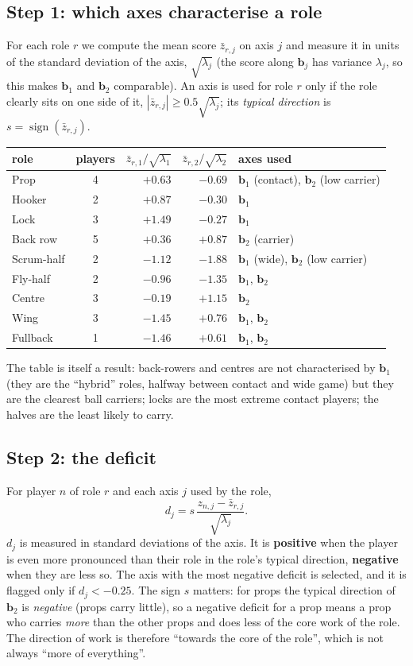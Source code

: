 \documentclass[11pt,a4paper]{article}
\theoremstyle{remark}
\newcommand{\bb}{\mathbf{b}}
\begin{document}
\subsection{Step 1: which axes characterise a role}
For each role $r$ we compute the mean score $\bar z_{r,j}$ on axis $j$ and measure it in units of the
standard deviation of the axis, $\sqrt{\lambda_j}$ (the score along $\bb_j$ has variance $\lambda_j$, so this
makes $\bb_1$ and $\bb_2$ comparable). An axis is used for role $r$ only if the role clearly sits on one
side of it, $|\bar z_{r,j}|\ge 0.5\sqrt{\lambda_j}$; its \emph{typical direction} is
$s=\operatorname{sign}(\bar z_{r,j})$.
\begin{center}
\begin{tabular}{lcrrl}
\toprule
role & players & $\bar z_{r,1}/\sqrt{\lambda_1}$ & $\bar z_{r,2}/\sqrt{\lambda_2}$ & axes used\\
\midrule
Prop & 4 & $+0.63$ & $-0.69$ & $\bb_1$ (contact), $\bb_2$ (low carrier)\\
Hooker & 2 & $+0.87$ & $-0.30$ & $\bb_1$\\
Lock & 3 & $+1.49$ & $-0.27$ & $\bb_1$\\
Back row & 5 & $+0.36$ & $+0.87$ & $\bb_2$ (carrier)\\
Scrum-half & 2 & $-1.12$ & $-1.88$ & $\bb_1$ (wide), $\bb_2$ (low carrier)\\
Fly-half & 2 & $-0.96$ & $-1.35$ & $\bb_1$, $\bb_2$\\
Centre & 3 & $-0.19$ & $+1.15$ & $\bb_2$\\
Wing & 3 & $-1.45$ & $+0.76$ & $\bb_1$, $\bb_2$\\
Fullback & 1 & $-1.46$ & $+0.61$ & $\bb_1$, $\bb_2$\\
\bottomrule
\end{tabular}
\end{center}
The table is itself a result: back-rowers and centres are not characterised by $\bb_1$ (they are the
``hybrid'' roles, halfway between contact and wide game) but they are the clearest ball carriers;
locks are the most extreme contact players; the halves are the least likely to carry.

\subsection{Step 2: the deficit}
For player $n$ of role $r$ and each axis $j$ used by the role,
\[
d_j=s\,\frac{z_{n,j}-\bar z_{r,j}}{\sqrt{\lambda_j}} .
\]
$d_j$ is measured in standard deviations of the axis. It is \textbf{positive} when the player is even more
pronounced than their role in the role's typical direction, \textbf{negative} when they are less so.
The axis with the most negative deficit is selected, and it is flagged only if $d_j<-0.25$.
The sign $s$ matters: for props the typical direction of $\bb_2$ is \emph{negative} (props carry little),
so a negative deficit for a prop means a prop who carries \emph{more} than the other props and does less of
the core work of the role. The direction of work is therefore ``towards the core of the role'', which is
not always ``more of everything''.
\end{document}

